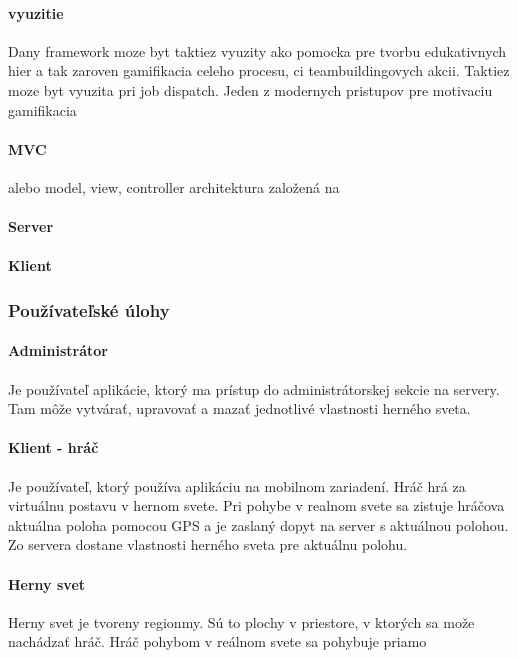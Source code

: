 \paragraph{vyuzitie}
Dany framework moze byt taktiez vyuzity ako pomocka pre tvorbu edukativnych hier a tak zaroven gamifikacia celeho procesu, ci teambuildingovych akcii. Taktiez moze byt vyuzita pri job dispatch. 
Jeden z modernych pristupov pre motivaciu gamifikacia 





\paragraph{MVC} alebo model, view, controller architektura založená na
\paragraph{Server}
\paragraph{Klient}


\subsubsection{Používateľské úlohy}
\paragraph{Administrátor}
Je používateľ aplikácie, ktorý ma prístup do administrátorskej sekcie na servery. Tam môže vytvárať, upravovať a mazať jednotlivé vlastnosti herného sveta. 

\paragraph{Klient - hráč}
Je používateľ, ktorý používa aplikáciu na mobilnom zariadení. Hráč hrá za virtuálnu postavu v hernom svete. Pri pohybe v realnom svete sa zistuje hráčova aktuálna poloha pomocou GPS a je zaslaný dopyt na server s aktuálnou polohou. Zo servera dostane vlastnosti herného sveta pre aktuálnu polohu.

\paragraph{Herny svet}
Herny svet je tvoreny regionmy. Sú to plochy v priestore, v ktorých sa može nachádzať hráč. Hráč pohybom v reálnom svete sa pohybuje priamo



